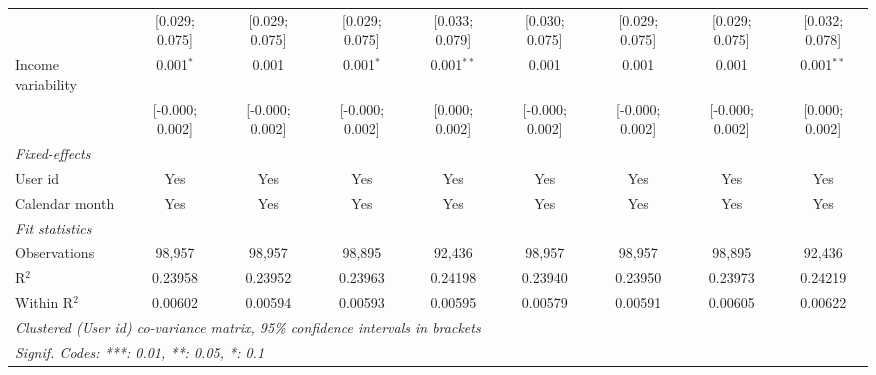 \begin{table}[htbp]
\begin{threeparttable}[b]
\begin{tabular}{lcccccccc}
                                          & [0.029; 0.075]   & [0.029; 0.075]   & [0.029; 0.075]   & [0.033; 0.079]   & [0.030; 0.075]   & [0.029; 0.075]   & [0.029; 0.075]   & [0.032; 0.078]\\   
         Income variability               & 0.001$^{*}$      & 0.001            & 0.001$^{*}$      & 0.001$^{**}$     & 0.001            & 0.001            & 0.001            & 0.001$^{**}$\\   
                                          & [-0.000; 0.002]  & [-0.000; 0.002]  & [-0.000; 0.002]  & [0.000; 0.002]   & [-0.000; 0.002]  & [-0.000; 0.002]  & [-0.000; 0.002]  & [0.000; 0.002]\\   
         \midrule
         \emph{Fixed-effects}\\
         User id                          & Yes              & Yes              & Yes              & Yes              & Yes              & Yes              & Yes              & Yes\\  
         Calendar month                   & Yes              & Yes              & Yes              & Yes              & Yes              & Yes              & Yes              & Yes\\  
         \midrule
         \emph{Fit statistics}\\
         Observations                     & 98,957           & 98,957           & 98,895           & 92,436           & 98,957           & 98,957           & 98,895           & 92,436\\  
         R$^2$                            & 0.23958          & 0.23952          & 0.23963          & 0.24198          & 0.23940          & 0.23950          & 0.23973          & 0.24219\\  
         Within R$^2$                     & 0.00602          & 0.00594          & 0.00593          & 0.00595          & 0.00579          & 0.00591          & 0.00605          & 0.00622\\  
         \midrule \midrule
         \multicolumn{9}{l}{\emph{Clustered (User id) co-variance matrix, 95\% confidence intervals in brackets}}\\
         \multicolumn{9}{l}{\emph{Signif. Codes: ***: 0.01, **: 0.05, *: 0.1}}\\
      \end{tabular}
   \end{threeparttable}
\end{table}


